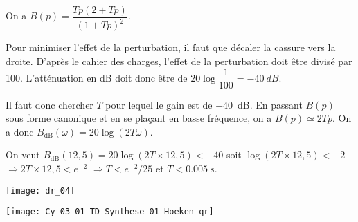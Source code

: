 \ifprof
\begin{corrige} 
On a  $B(p)=\dfrac{Tp\left(2+Tp \right)}{\left(1+Tp\right)^2}$.

Pour minimiser l'effet de la perturbation, il faut que décaler la cassure vers la droite. D'après le cahier des charges, l'effet de la perturbation doit être divisé par 100. L'atténuation en dB doit donc être de $20\log \dfrac{1}{100} = -\SI{40}{dB}$. 

Il faut donc chercher $T$ pour lequel le gain est de \SI{-40}{dB}. En passant $B(p)$ sous forme canonique et en se plaçant en basse fréquence, on a $B(p)\simeq 2Tp$. On a donc $B_{\text{dB}}(\omega)=20\log \left(2T\omega \right)$. 

On veut $B_{\text{dB}}(12,5)=20\log \left(2T\times 12,5\right) < -40$
soit $\log \left(2T\times 12,5\right) < -2$ $\Rightarrow  2T\times 12,5< e^{-2}$
$\Rightarrow  T< e^{-2}/25$ et $T<\SI{0,005}{s}$. 

\end{corrige}
\else
\fi

\begin{marginfigure}
\texttt{[image: dr\_04]}
\end{marginfigure}

\ifprof
\else
\begin{marginfigure}
\centering
\texttt{[image: Cy\_03\_01\_TD\_Synthese\_01\_Hoeken\_qr]}
\end{marginfigure}
\fi

\ifcolle
\else
\footnotesize
{}
\normalsize
\fi

